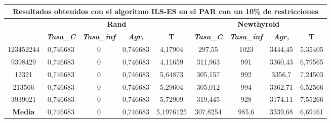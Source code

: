 \documentclass[12pt, spanish]{article}
\begin{document}
\begin{table}[H]
\begin{tabular}{|c|c|c|c|c|c|c|c|c|}
\hline
\multicolumn{9}{|c|}{\textbf{Resultados obtenidos con el algoritmo ILS-ES en el PAR con un 10\% de restricciones}}                                                                                                \\ \hline
\multirow{2}{*}{} & \multicolumn{4}{c|}{\textbf{Rand}}                                                            & \multicolumn{4}{c|}{\textbf{Newthyroid}}                                                      \\ \cline{2-9} 
                  & \textit{\textbf{Tasa\_C}} & \textit{\textbf{Tasa\_inf}} & \textit{\textbf{Agr,}} & \textbf{T} & \textit{\textbf{Tasa\_C}} & \textit{\textbf{Tasa\_inf}} & \textit{\textbf{Agr,}} & \textbf{T} \\ \hline
123452244         & 0,746683                  & 0                           & 0,746683               & 4,17904    & 297,55                    & 1023                        & 3444,45                & 5,35405    \\ \hline
9398429           & 0,746683                  & 0                           & 0,746683               & 4,11659    & 311,963                   & 991                         & 3360,43                & 6,79565    \\ \hline
12321             & 0,746683                  & 0                           & 0,746683               & 5,64873    & 305,157                   & 992                         & 3356,7                 & 7,24503    \\ \hline
213566            & 0,746683                  & 0                           & 0,746683               & 5,29604    & 305,012                   & 994                         & 3362,71                & 6,52566    \\ \hline
3939021           & 0,746683                  & 0                           & 0,746683               & 5,72909    & 319,445                   & 928                         & 3174,11                & 7,55266    \\ \hline
\textbf{Media}    & 0,746683                  & 0                           & 0,746683               & 5,1976125  & 307,8254                  & 985,6                       & 3339,68                & 6,69461    \\ \hline
\end{tabular}
\end{table}
\end{document}
